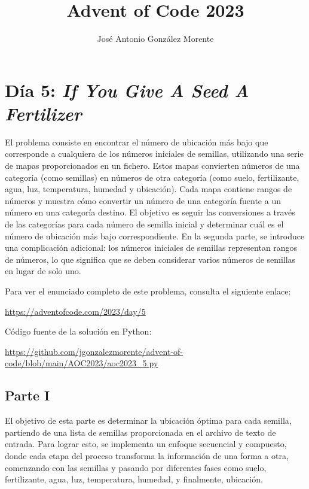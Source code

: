 \documentclass[a4paper,12pt]{article}
\title{Advent of Code 2023 }
\author{José Antonio González Morente}
\begin{document}
\maketitle
\tableofcontents

\section{Día 5: \textnormal{ \it If You Give A Seed A Fertilizer}}

El problema consiste en encontrar el número de ubicación más bajo que corresponde a cualquiera de los números iniciales de semillas, utilizando una serie de mapas proporcionados en un fichero. Estos mapas convierten números de una categoría (como semillas) en números de otra categoría (como suelo, fertilizante, agua, luz, temperatura, humedad y ubicación). Cada mapa contiene rangos de números y muestra cómo convertir un número de una categoría fuente a un número en una categoría destino. El objetivo es seguir las conversiones a través de las categorías para cada número de semilla inicial y determinar cuál es el número de ubicación más bajo correspondiente. En la segunda parte, se introduce una complicación adicional: los números iniciales de semillas representan rangos de números, lo que significa que se deben considerar varios números de semillas en lugar de solo uno.

Para ver el enunciado completo de este problema, consulta el siguiente enlace:
\begin{center}
    \href{https://adventofcode.com/2023/day/5}{https://adventofcode.com/2023/day/5}
\end{center}

Código fuente de la solución en Python:
\begin{center}
    \href{https://github.com/jgonzalezmorente/advent-of-code/blob/main/AOC2023/aoc2023_5.py}{https://github.com/jgonzalezmorente/advent-of-code/blob/main/AOC2023/aoc2023\_5.py}
\end{center}


\subsection{Parte I}


El objetivo de esta parte es determinar la ubicación óptima para cada semilla, partiendo de una lista de semillas proporcionada en el archivo de texto de entrada. Para lograr esto, se implementa un enfoque secuencial y compuesto, donde cada etapa del proceso transforma la información de una forma a otra, comenzando con las semillas y pasando por diferentes fases como suelo, fertilizante, agua, luz, temperatura, humedad, y finalmente, ubicación.
\end{document}
